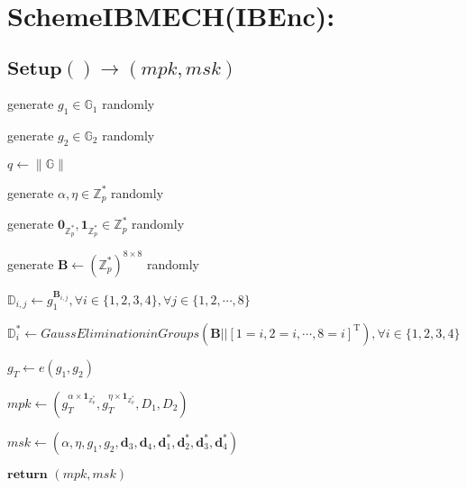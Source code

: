 \documentclass[a4paper]{article}
\begin{document}
\section{SchemeIBMECH(IBEnc):}

\subsection{$\textbf{Setup}() \rightarrow (\textit{mpk}, \textit{msk})$}

generate $g_1 \in \mathbb{G}_1$ randomly

generate $g_2 \in \mathbb{G}_2$ randomly

$q \gets \|\mathbb{G}\|$

generate $\alpha, \eta \in \mathbb{Z}_p^*$ randomly

generate $\mathbf{0}_{\mathbb{Z}_p^*}, \mathbf{1}_{\mathbb{Z}_p^*} \in \mathbb{Z}_p^*$ randomly

generate $\bm{B} \gets (\mathbb{Z}_p^*)^{8 \times 8}$ randomly

$\mathbb{D}_{i, j} \gets g_1^{\bm{B}_{i, j}}, \forall i \in \{1, 2, 3, 4\}, \forall j \in \{1, 2, \cdots, 8\}$

$\mathbb{D}_i^* \gets \textit{GaussEliminationinGroups}(\bm{B} || [1 = i, 2 = i, \cdots, 8 = i]^\mathrm{T}), \forall i \in \{1, 2, 3, 4\}$

$g_T \gets e(g_1, g_2)$

$\textit{mpk} \gets (g_T^{\alpha \times \mathbf{1}_{\mathbb{Z}_p^*}}, g_T^{\eta \times \mathbf{1}_{\mathbb{Z}_p^*}}, D_1, D_2)$

$\textit{msk} \gets (\alpha, \eta, g_1, g_2, \bm{d}_3, \bm{d}_4, \bm{d}_1^*, \bm{d}_2^*, \bm{d}_3^*, \bm{d}_4^*)$

$\textbf{return }(\textit{mpk}, \textit{msk})$
\end{document}
